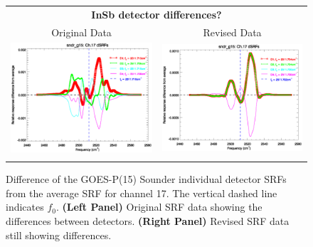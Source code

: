 \begin{figure}[htp]
  \centering
  \begin{tabular}{c c}
    \multicolumn{2}{c}{\textsf{\bfseries InSb detector differences?}} \\
    \hspace{1.5em}\textsf{Original Data} &
    \hspace{1.5em}\textsf{Revised Data} \\
    \includegraphics[scale=0.5,trim=0 40 0 0]{graphics/dsrf_anomaly/original/sndr_g15.ch17.srf.eps} &
    \includegraphics[scale=0.5,trim=0 40 0 0]{graphics/dsrf_anomaly/revised/sndr_g15.ch17.srf.eps} \\\\
  \end{tabular}
  \caption{Difference of the GOES-P(15) Sounder individual detector SRFs from the average SRF for channel 17. The vertical dashed line indicates $f_0$. \textbf{(Left Panel)} Original SRF data showing the differences between detectors. \textbf{(Right Panel)} Revised SRF data still showing differences.}
  \label{fig:sndr_g15.ch17.dsrf_anomaly}
\end{figure}


